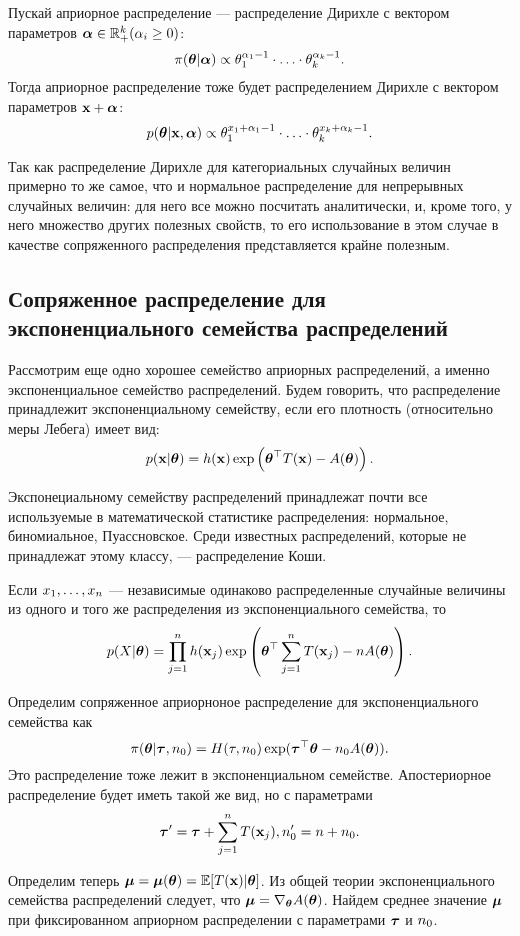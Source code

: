 Пускай априорное распределение --- распределение Дирихле с вектором параметров $\boldsymbol{\alpha} \in \mathbb{R}_+^k (\alpha_i \geq 0)$:
\[
\pi(\boldsymbol{\theta} | \boldsymbol{\alpha}) \propto \theta_1^{\alpha_1 - 1} \cdot \ldots \cdot \theta_k^{\alpha_k - 1}.
\]
Тогда априорное распределение тоже будет распределением Дирихле с вектором параметров $\mathbf{x} + \boldsymbol{\alpha}$:
\[
p(\boldsymbol{\theta} | \mathbf{x}, \boldsymbol{\alpha}) \propto \theta_1^{x_1 + \alpha_1 - 1} \cdot \ldots \cdot \theta_k^{x_k + \alpha_k - 1}.
\]

Так как распределение Дирихле для категориальных случайных величин примерно то же самое, что и нормальное распределение для непрерывных случайных величин: для него все можно посчитать аналитически, и, кроме того, у него множество других полезных свойств, то его использование в этом случае в качестве сопряженного распределения представляется крайне полезным.

\subsection{Сопряженное распределение для экспоненциального семейства распределений}

Рассмотрим еще одно хорошее семейство априорных распределений, а именно экспоненциальное семейство распределений.
Будем говорить, что распределение принадлежит экспоненциальному семейству, если
его плотность (относительно меры Лебега) имеет вид:
\[
p(\mathbf{x} | \boldsymbol{\theta}) = h(\mathbf{x}) \exp \left(\boldsymbol{\theta}^\top T(\mathbf{x}) - A(\boldsymbol{\theta}) \right).
\]

Экспонециальному семейству распределений принадлежат почти все используемые в математической статистике распределения: нормальное, биномиальное, Пуассновское.
Среди известных распределений, которые не принадлежат этому классу, --- распределение Коши.

Если $x_1, \ldots, x_n$ --- независимые одинаково распределенные случайные величины из одного и того же распределения из экспоненциального семейства, то
\[
p(X | \boldsymbol{\theta}) = \prod_{j = 1}^{n} h(\mathbf{x}_j) \exp \left(\boldsymbol{\theta}^\top \sum_{j = 1}^n T(\mathbf{x}_j) - n A(\boldsymbol{\theta}) \right).
\]

Определим сопряженное априорноное распределение для экспоненциального семейства как
\[
\pi(\boldsymbol{\theta} | \boldsymbol{\tau}, n_0) = H(\tau, n_0) \exp(\boldsymbol{\tau}^\top \boldsymbol{\theta} - n_0 A(\boldsymbol{\theta})).
\]
Это распределение тоже лежит в экспоненциальном семействе.
Апостериорное распределение будет иметь такой же вид, 
но с параметрами 
\[
\boldsymbol{\tau}' = \boldsymbol{\tau} + \sum_{j = 1}^n T(\mathbf{x}_j), n'_0 = n + n_0.
\]

Определим теперь $\boldsymbol{\mu} = \boldsymbol{\mu}(\boldsymbol{\theta}) = \mathbb{E} [T(\mathbf{x}) | \boldsymbol{\theta}]$.
Из общей теории экспоненциального семейства распределений 
следует, что $\boldsymbol{\mu} = \nabla_{\boldsymbol{\theta}} A(\boldsymbol{\theta})$.
Найдем среднее значение $\boldsymbol{\mu}$ при фиксированном априорном распределении с параметрами $\boldsymbol{\tau}$ и $n_0$.

